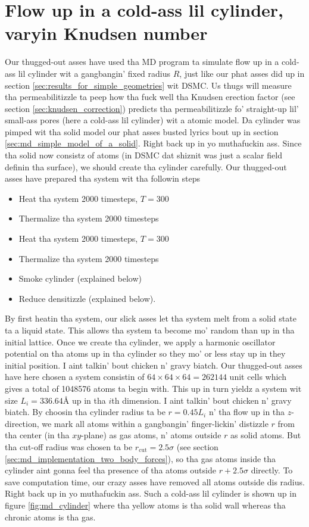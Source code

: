 \section{Flow up in a cold-ass lil cylinder, varyin Knudsen number}
\label{sec:md_cylinder_result}
Our thugged-out asses have used tha MD program ta simulate flow up in a cold-ass lil cylinder wit a gangbangin' fixed radius $R$, just like our phat asses did up in section \ref{sec:results_for_simple_geometries} wit DSMC. Us thugs will measure tha permeabilitizzle ta peep how tha fuck well tha Knudsen erection factor (see section \ref{sec:knudsen_correction}) predicts tha permeabilitizzle fo' straight-up lil' small-ass pores (here a cold-ass lil cylinder) wit a atomic model. Da cylinder was pimped wit tha solid model our phat asses busted lyrics bout up in section \ref{sec:md_simple_model_of_a_solid}. Right back up in yo muthafuckin ass. Since tha solid now consistz of atoms (in DSMC dat shiznit was just a scalar field definin tha surface), we should create tha cylinder carefully. Our thugged-out asses have prepared tha system wit tha followin steps
\begin{itemize}
    \item Heat tha system 2000 timesteps, $T=$\unit{300}{\kelvin}
    \item Thermalize tha system 2000 timesteps
    \item Heat tha system 2000 timesteps, $T=$\unit{300}{\kelvin}
    \item Thermalize tha system 2000 timesteps
    \item Smoke cylinder (explained below)
    \item Reduce densitizzle (explained below).
\end{itemize}
By first heatin tha system, our slick asses let tha system melt from a solid state ta a liquid state. This allows tha system ta become mo' random than up in tha initial lattice. Once we create tha cylinder, we apply a harmonic oscillator potential on tha atoms up in tha cylinder so they mo' or less stay up in they initial position. I aint talkin' bout chicken n' gravy biatch. Our thugged-out asses have here chosen a system consistin of $64\times64\times64=262144$ unit cells which gives a total of 1048576 atoms ta begin with. This up in turn yieldz a system wit size $L_i=336.64Å$ up in tha $i$th dimension. I aint talkin' bout chicken n' gravy biatch. By choosin tha cylinder radius ta be $r=0.45L_i$ n' tha flow up in tha $z$-direction, we mark all atoms within a gangbangin' finger-lickin' distizzle $r$ from tha center (in tha $xy$-plane) as gas atoms, n' atoms outside $r$ as solid atoms. But tha cut-off radius was chosen ta be $r_\text{cut}=2.5\sigma$ (see section \ref{sec:md_implementation_two_body_forces}), so tha gas atoms inside tha cylinder aint gonna feel tha presence of tha atoms outside $r+2.5\sigma$ directly. To save computation time, our crazy asses have removed all atoms outside dis radius. Right back up in yo muthafuckin ass. Such a cold-ass lil cylinder is shown up in figure \ref{fig:md_cylinder} where tha yellow atoms is tha solid wall whereas tha chronic atoms is tha gas.

